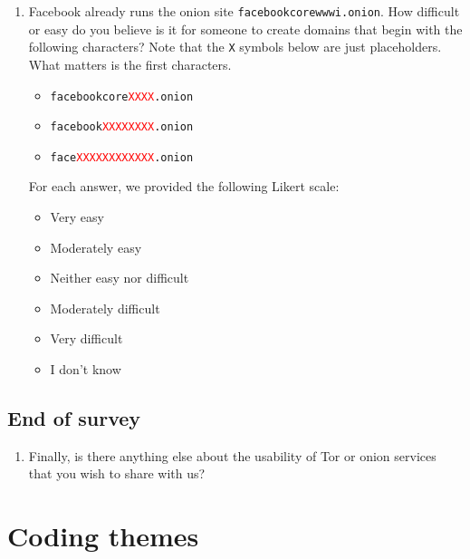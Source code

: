 \begin{enumerate}
    \item Facebook already runs the onion site \texttt{facebookcorewwwi.onion}.
        How difficult or easy do you believe is it for someone to create domains
        that begin with the following characters? Note that the {\color{red}
        \texttt{X}} symbols below
        are just placeholders. What matters is the first characters.
        \begin{itemize}
            \item \texttt{facebookcore\textcolor{red}{XXXX}.onion}
            \item \texttt{facebook\textcolor{red}{XXXXXXXX}.onion}
            \item \texttt{face\textcolor{red}{XXXXXXXXXXXX}.onion}
        \end{itemize}
        For each answer, we provided the following Likert scale:
        \begin{itemize}
            \item Very easy
            \item Moderately easy
            \item Neither easy nor difficult
            \item Moderately difficult
            \item Very difficult
            \item I don't know
        \end{itemize}
\end{enumerate}

\subsection{End of survey}
\begin{enumerate}
    \item Finally, is there anything else about the usability of Tor or onion
        services that you wish to share with us?
\end{enumerate}

\section{Coding themes}
\label{sec:coding-themes}

